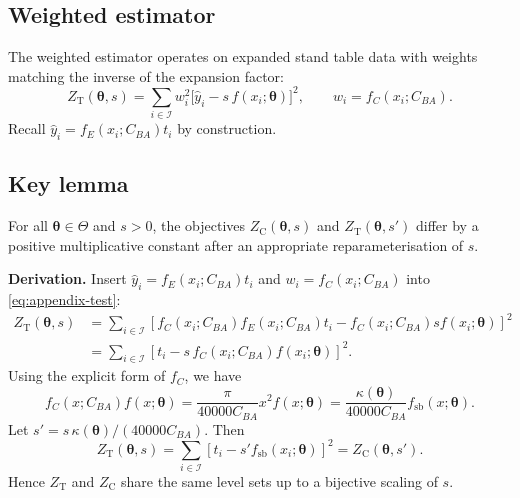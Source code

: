 \subsection{Weighted estimator}

The weighted estimator operates on expanded stand table data with weights
matching the inverse of the expansion factor:
\begin{equation}
  Z_{\mathrm{T}}(\boldsymbol{\theta}, s)
  =
  \sum_{i \in \mathcal{I}}
  w_i^2 
  \Big[\hat{y}_i - s\, f(x_i; \boldsymbol{\theta})\Big]^2,
  \qquad
  w_i = f_C(x_i; C_{BA}).
  \label{eq:appendix-test}
\end{equation}
Recall $\hat{y}_i = f_E(x_i; C_{BA}) t_i$ by construction.

\subsection{Key lemma}

\begin{lemma}
For all $\boldsymbol{\theta}\in\Theta$ and $s>0$, the objectives
$Z_{\mathrm{C}}(\boldsymbol{\theta}, s)$ and $Z_{\mathrm{T}}(\boldsymbol{\theta}, s')$ differ
by a positive multiplicative constant after an appropriate reparameterisation of
$s$.
\end{lemma}

\noindent\textbf{Derivation.}
Insert $\hat{y}_i = f_E(x_i; C_{BA}) t_i$ and $w_i = f_C(x_i; C_{BA})$ into
\eqref{eq:appendix-test}:
\begin{align}
  Z_{\mathrm{T}}(\boldsymbol{\theta}, s)
    &= \sum_{i \in \mathcal{I}} \left[f_C(x_i; C_{BA}) f_E(x_i; C_{BA}) t_i
      - f_C(x_i; C_{BA}) s f(x_i; \boldsymbol{\theta})\right]^2 \\
    &= \sum_{i \in \mathcal{I}} \left[t_i - s \, f_C(x_i; C_{BA}) f(x_i; \boldsymbol{\theta})\right]^2.
\end{align}
Using the explicit form of $f_C$, we have
\begin{equation}
  f_C(x; C_{BA}) f(x; \boldsymbol{\theta})
  =
  \frac{\pi}{40000 C_{BA}} x^{2} f(x;\boldsymbol{\theta})
  =
  \frac{\kappa(\boldsymbol{\theta})}{40000 C_{BA}} f_{\mathrm{sb}}(x; \boldsymbol{\theta}).
\end{equation}
Let $s' = s\, \kappa(\boldsymbol{\theta})/(40000 C_{BA})$. Then
\begin{equation}
  Z_{\mathrm{T}}(\boldsymbol{\theta}, s)
  =
  \sum_{i \in \mathcal{I}} \left[t_i - s' f_{\mathrm{sb}}(x_i; \boldsymbol{\theta})\right]^2
  =
  Z_{\mathrm{C}}(\boldsymbol{\theta}, s').
\end{equation}
Hence $Z_{\mathrm{T}}$ and $Z_{\mathrm{C}}$ share the same level sets up to a
bijective scaling of $s$.

